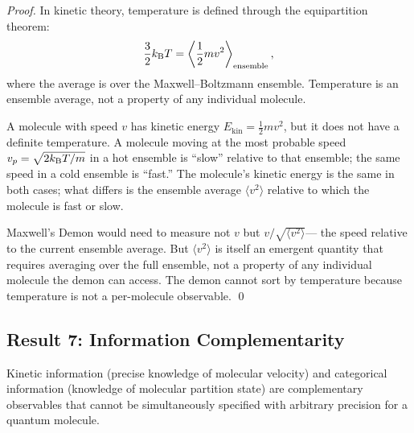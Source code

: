 \begin{proof}
In kinetic theory, temperature is defined through the equipartition theorem:
\begin{equation}
  \frac{3}{2} k_{\mathrm{B}} T = \left\langle \frac{1}{2} m v^2 \right\rangle_{\mathrm{ensemble}},
  \label{eq:temperature_equipartition}
\end{equation}
where the average is over the Maxwell--Boltzmann ensemble. Temperature is an
ensemble average, not a property of any individual molecule.

A molecule with speed $v$ has kinetic energy $E_{\mathrm{kin}} = \frac{1}{2}mv^2$,
but it does not have a definite temperature. A molecule moving at the most
probable speed $v_p = \sqrt{2k_{\mathrm{B}} T/m}$ in a hot ensemble is ``slow'' relative
to that ensemble; the same speed in a cold ensemble is ``fast.'' The molecule's
kinetic energy is the same in both cases; what differs is the ensemble average
$\langle v^2 \rangle$ relative to which the molecule is fast or slow.

Maxwell's Demon would need to measure not $v$ but $v / \sqrt{\langle v^2 \rangle}$---
the speed relative to the current ensemble average. But $\langle v^2 \rangle$
is itself an emergent quantity that requires averaging over the full ensemble,
not a property of any individual molecule the demon can access. The demon
cannot sort by temperature because temperature is not a per-molecule observable.
\qed
\end{proof}

\subsection{Result 7: Information Complementarity}

\begin{theorem}
\label{thm:info_complementarity}
Kinetic information (precise knowledge of molecular velocity) and categorical
information (knowledge of molecular partition state) are complementary observables
that cannot be simultaneously specified with arbitrary precision for a quantum
molecule.
\end{theorem}

